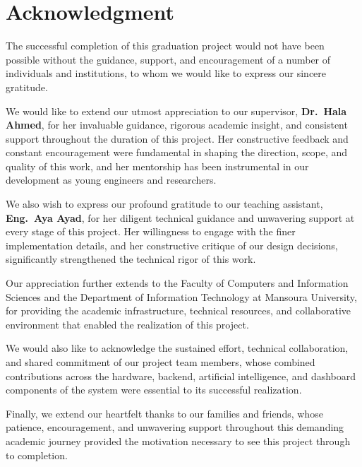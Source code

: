 \chapter*{Acknowledgment}
\thispagestyle{plain}

The successful completion of this graduation project would not have been possible without
the guidance, support, and encouragement of a number of individuals and institutions, to
whom we would like to express our sincere gratitude.

We would like to extend our utmost appreciation to our supervisor, \textbf{Dr.\ Hala
	Ahmed}, for her invaluable guidance, rigorous academic insight, and consistent support
throughout the duration of this project. Her constructive feedback and constant
encouragement were fundamental in shaping the direction, scope, and quality of this work,
and her mentorship has been instrumental in our development as young engineers and
researchers.

We also wish to express our profound gratitude to our teaching assistant, \textbf{Eng.\ Aya
	Ayad}, for her diligent technical guidance and unwavering support at every stage of this
project. Her willingness to engage with the finer implementation details, and her
constructive critique of our design decisions, significantly strengthened the technical
rigor of this work.

Our appreciation further extends to the Faculty of Computers and Information Sciences and
the Department of Information Technology at Mansoura University, for providing the
academic infrastructure, technical resources, and collaborative environment that enabled
the realization of this project.

We would also like to acknowledge the sustained effort, technical collaboration, and
shared commitment of our project team members, whose combined contributions across the
hardware, backend, artificial intelligence, and dashboard components of the system were
essential to its successful realization.

Finally, we extend our heartfelt thanks to our families and friends, whose patience,
encouragement, and unwavering support throughout this demanding academic journey provided
the motivation necessary to see this project through to completion.

\clearpage
